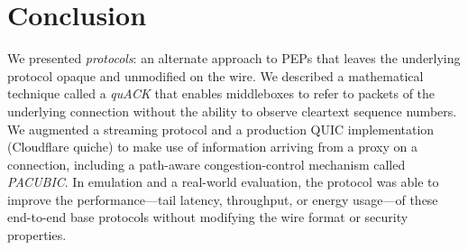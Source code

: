 \section{Conclusion}
\label{sec:conclusion}

We presented \emph{\sys protocols}: an alternate approach to PEPs that leaves
the underlying protocol opaque and unmodified on the wire.
We described a mathematical technique called a \emph{quACK} that enables
middleboxes to refer to packets of the underlying connection without the ability
to observe cleartext sequence numbers.
We augmented a streaming protocol and a production QUIC implementation
(Cloudflare quiche)
to make use of information arriving from a proxy on a \sys connection,
including a path-aware congestion-control mechanism called \emph{PACUBIC}.
In emulation and a real-world evaluation, the \sys protocol
was able to improve the
performance---tail latency, throughput, or energy usage---of these
end-to-end base protocols without modifying the wire format or security properties.
